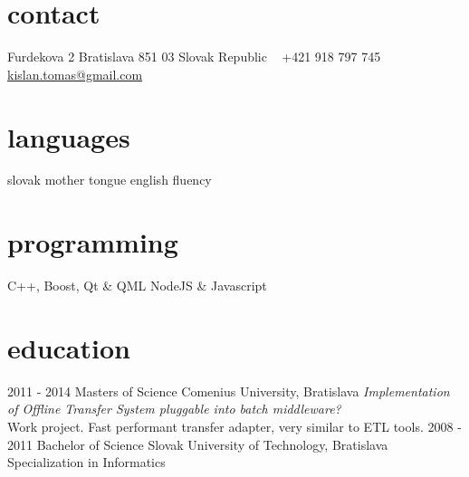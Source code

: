 \documentclass[]{friggeri-cv} %
\begin{document}


\begin{aside} %
\section{contact}
Furdekova 2
Bratislava 851 03
Slovak Republic
~
+421 918 797 745
~
\href{mailto:kislan.tomas@gmail.com}{kislan.tomas@gmail.com}
\section{languages}
slovak mother tongue
english fluency
\section{programming}
C++, Boost, Qt \& QML
NodeJS \& Javascript
\end{aside}


\section{education}

\begin{entrylist}
\entry
{2011 - 2014}
{Masters {\normalfont of Science}}
{Comenius University, Bratislava}
{\emph{Implementation of Offline Transfer System pluggable into batch middleware?} \\ Work project. Fast performant transfer adapter, very similar to ETL tools.}
\entry
{2008 - 2011}
{Bachelor {\normalfont of Science}}
{Slovak University of Technology, Bratislava}
{Specialization in Informatics}
\end{entrylist}

\end{document}
